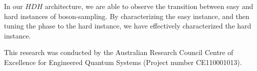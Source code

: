\documentclass[aps,pra,twocolumn,amsmath,amssymb,nofootinbib,superscriptaddress]{revtex4}
\begin{document}
In our $HDH$ architecture, we are able to observe the transition between easy and hard instances of boson-sampling. By characterizing the easy instance, and then tuning the phase to the hard instance, we have effectively characterized the hard instance.

%
%

\begin{acknowledgments}
This research was conducted by the Australian Research Council Centre of Excellence for Engineered Quantum Systems (Project number CE110001013).
\end{acknowledgments}

%
%


\end{document}
